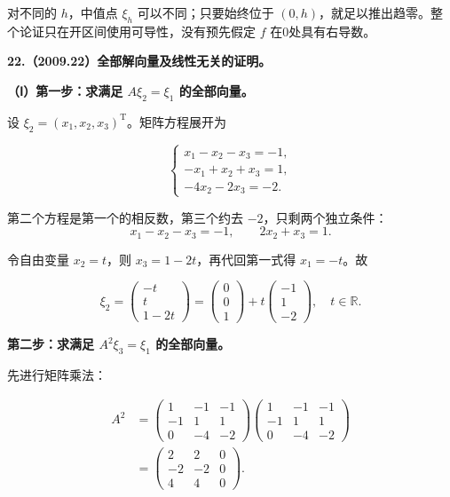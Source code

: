 \documentclass[UTF8,11pt,fontset=windows]{ctexart}
\begin{document}
对不同的 $h$，中值点 $\xi_h$ 可以不同；只要始终位于 $(0,h)$，就足以推出趋零。整个论证只在开区间使用可导性，没有预先假定 $f$ 在0处具有右导数。

\clearpage

\textbf{22.（2009.22）全部解向量及线性无关的证明。}

\textbf{（Ⅰ）第一步：求满足 $A\xi_2=\xi_1$ 的全部向量。}

设 $\xi_2=(x_1,x_2,x_3)^{\mathrm T}$。矩阵方程展开为

$$
\begin{cases}
x_1-x_2-x_3=-1,\\
-x_1+x_2+x_3=1,\\
-4x_2-2x_3=-2.
\end{cases}
$$

第二个方程是第一个的相反数，第三个约去 $-2$，只剩两个独立条件：
$$
x_1-x_2-x_3=-1,
\qquad2x_2+x_3=1.
$$

令自由变量 $x_2=t$，则 $x_3=1-2t$，再代回第一式得 $x_1=-t$。故

$$
\boxed{\xi_2=\begin{pmatrix}-t\\t\\1-2t\end{pmatrix}
=\begin{pmatrix}0\\0\\1\end{pmatrix}
+t\begin{pmatrix}-1\\1\\-2\end{pmatrix},\quad t\in\mathbb R.}
$$

\textbf{第二步：求满足 $A^2\xi_3=\xi_1$ 的全部向量。}

先进行矩阵乘法：

$$
\begin{aligned}
A^2&=\begin{pmatrix}1&-1&-1\\-1&1&1\\0&-4&-2\end{pmatrix}
\begin{pmatrix}1&-1&-1\\-1&1&1\\0&-4&-2\end{pmatrix}\\
&=\begin{pmatrix}2&2&0\\-2&-2&0\\4&4&0\end{pmatrix}.
\end{aligned}
$$
\end{document}
